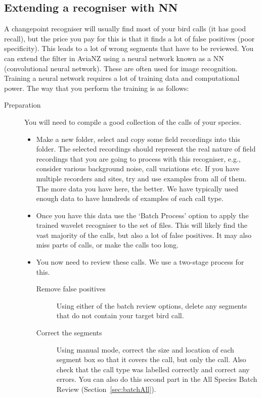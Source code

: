 \documentclass{article}
\begin{document}
\subsection{Extending a recogniser with NN}\label{sec:nnfilter}

A changepoint recogniser will usually find most of your bird calls (it has good recall), but the price you pay for this is that it finds a lot of false positives (poor specificity). This leads to a lot of wrong segments that have to be reviewed. You can extend the filter in AviaNZ using a neural network known as a NN (convolutional neural network). These are often used for image recognition. Training a neural network requires a lot of training data and computational power. The way that you perform the training is as follows:

\begin{description}
\item[Preparation] You will need to compile a good collection of the calls of your species. 
\begin{itemize}
\item Make a new folder, select and copy some field recordings into this folder. The selected recordings should represent the real nature of field recordings that you are going to process with this recogniser, e.g., consider various background noise, call variations etc. If you have multiple recorders and sites, try and use examples from all of them. The more data you have here, the better. We have typically used enough data to have hundreds of examples of each call type.
\item Once you have this data use the `Batch Process' option to apply the trained wavelet recogniser to the set of files. This will likely find the vast majority of the calls, but also a lot of false positives. It may also miss parts of calls, or make the calls too long. 
\item You now need to review these calls. We use a two-stage process for this.
    \begin{description} 
    \item[Remove false positives] Using either of the batch review options, delete any segments that do not contain your target bird call. 
    \item[Correct the segments] Using manual mode, correct the size and location of each segment box so that it covers the call, but only the call. Also check that the call type was labelled correctly and correct any errors. You can also do this second part in the All Species Batch Review (Section~\ref{sec:batchAll}).


\end{description}
\end{itemize}
\end{description}
\end{document}
